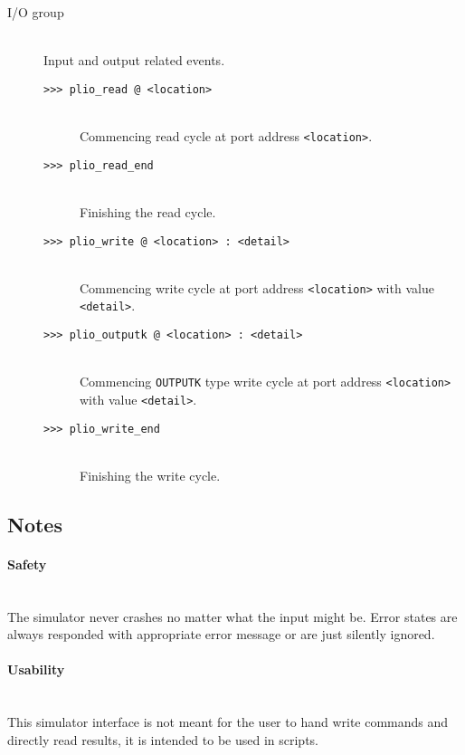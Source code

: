 \begin{description}
            \item[I/O group]~\\
                Input and output related events.
                \begin{description}
                    \item[\texttt{>{}>{}> plio\_read @ <location>}]~\\
                        Commencing read cycle at port address \texttt{<location>}.
                    \item[\texttt{>{}>{}> plio\_read\_end}]~\\
                        Finishing the read cycle.
                    \item[\texttt{>{}>{}> plio\_write @ <location> : <detail>}]~\\
                        Commencing write cycle at port address \texttt{<location>} with value \texttt{<detail>}.
                    \item[\texttt{>{}>{}> plio\_outputk @ <location> : <detail>}]~\\
                        Commencing \texttt{OUTPUTK} type write cycle at port address \texttt{<location>} with value \texttt{<detail>}.
                    \item[\texttt{>{}>{}> plio\_write\_end}]~\\
                        Finishing the write cycle.
                \end{description}
        \end{description}

    \subsection{Notes}
        \paragraph{Safety}~\\
            The simulator never crashes no matter what the input might be. Error states are always responded with appropriate error message or are just silently ignored.

        \paragraph{Usability}~\\
            This simulator interface is not meant for the user to hand write commands and directly read results, it is intended to be used in scripts.

